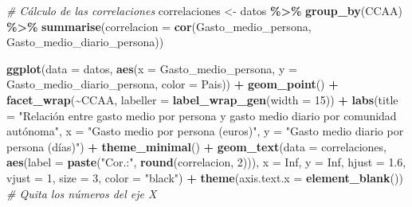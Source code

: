 \documentclass[data,article,submit,moreauthors,pdftex]{Definitions/mdpi}
\newenvironment{Shaded}{\begin{snugshade}}{\end{snugshade}}
\newcommand{\AttributeTok}[1]{\textcolor[rgb]{0.13,0.29,0.53}{#1}}
\newcommand{\CommentTok}[1]{\textcolor[rgb]{0.56,0.35,0.01}{\textit{#1}}}
\newcommand{\ConstantTok}[1]{\textcolor[rgb]{0.56,0.35,0.01}{#1}}
\newcommand{\DecValTok}[1]{\textcolor[rgb]{0.00,0.00,0.81}{#1}}
\newcommand{\FloatTok}[1]{\textcolor[rgb]{0.00,0.00,0.81}{#1}}
\newcommand{\FunctionTok}[1]{\textcolor[rgb]{0.13,0.29,0.53}{\textbf{#1}}}
\newcommand{\NormalTok}[1]{#1}
\newcommand{\OtherTok}[1]{\textcolor[rgb]{0.56,0.35,0.01}{#1}}
\newcommand{\SpecialCharTok}[1]{\textcolor[rgb]{0.81,0.36,0.00}{\textbf{#1}}}
\newcommand{\StringTok}[1]{\textcolor[rgb]{0.31,0.60,0.02}{#1}}
\begin{document}
\begin{Shaded}
\begin{Highlighting}[]
\CommentTok{\# Cálculo de las correlaciones}
\NormalTok{correlaciones }\OtherTok{\textless{}{-}}\NormalTok{ datos }\SpecialCharTok{\%\textgreater{}\%}
    \FunctionTok{group\_by}\NormalTok{(CCAA) }\SpecialCharTok{\%\textgreater{}\%}
    \FunctionTok{summarise}\NormalTok{(}\AttributeTok{correlacion =} \FunctionTok{cor}\NormalTok{(Gasto\_medio\_persona, Gasto\_medio\_diario\_persona))}

\FunctionTok{ggplot}\NormalTok{(}\AttributeTok{data =}\NormalTok{ datos, }\FunctionTok{aes}\NormalTok{(}\AttributeTok{x =}\NormalTok{ Gasto\_medio\_persona, }\AttributeTok{y =}\NormalTok{ Gasto\_medio\_diario\_persona,}
    \AttributeTok{color =}\NormalTok{ Pais)) }\SpecialCharTok{+} \FunctionTok{geom\_point}\NormalTok{() }\SpecialCharTok{+} \FunctionTok{facet\_wrap}\NormalTok{(}\SpecialCharTok{\textasciitilde{}}\NormalTok{CCAA, }\AttributeTok{labeller =} \FunctionTok{label\_wrap\_gen}\NormalTok{(}\AttributeTok{width =} \DecValTok{15}\NormalTok{)) }\SpecialCharTok{+}
    \FunctionTok{labs}\NormalTok{(}\AttributeTok{title =} \StringTok{"Relación entre gasto medio por persona y gasto medio diario por comunidad autónoma"}\NormalTok{,}
        \AttributeTok{x =} \StringTok{"Gasto medio por persona (euros)"}\NormalTok{, }\AttributeTok{y =} \StringTok{"Gasto medio diario por persona (días)"}\NormalTok{) }\SpecialCharTok{+}
    \FunctionTok{theme\_minimal}\NormalTok{() }\SpecialCharTok{+} \FunctionTok{geom\_text}\NormalTok{(}\AttributeTok{data =}\NormalTok{ correlaciones, }\FunctionTok{aes}\NormalTok{(}\AttributeTok{label =} \FunctionTok{paste}\NormalTok{(}\StringTok{"Cor.:"}\NormalTok{,}
    \FunctionTok{round}\NormalTok{(correlacion, }\DecValTok{2}\NormalTok{))), }\AttributeTok{x =} \ConstantTok{Inf}\NormalTok{, }\AttributeTok{y =} \ConstantTok{Inf}\NormalTok{, }\AttributeTok{hjust =} \FloatTok{1.6}\NormalTok{, }\AttributeTok{vjust =} \DecValTok{1}\NormalTok{,}
    \AttributeTok{size =} \DecValTok{3}\NormalTok{, }\AttributeTok{color =} \StringTok{"black"}\NormalTok{) }\SpecialCharTok{+} \FunctionTok{theme}\NormalTok{(}\AttributeTok{axis.text.x =} \FunctionTok{element\_blank}\NormalTok{())  }\CommentTok{\# Quita los números del eje X}
\end{Highlighting}
\end{Shaded}
\end{document}
